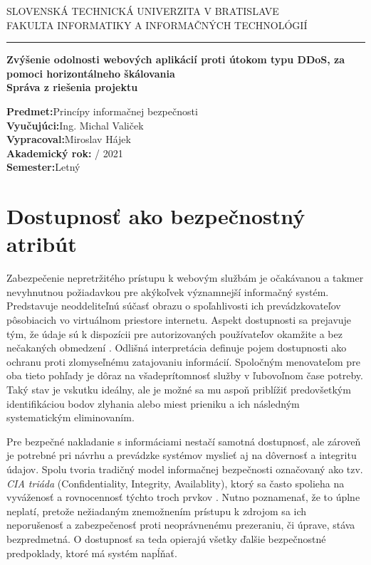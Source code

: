\documentclass[12pt, a4paper]{article}
\begin{document}
\begin{titlepage}
    \hspace{0pt}
    \centering
    \large SLOVENSKÁ TECHNICKÁ UNIVERZITA V BRATISLAVE \\
    \large FAKULTA INFORMATIKY A INFORMAČNÝCH TECHNOLÓGIÍ
    \noindent\rule{\textwidth}{1pt}
    \vfill
    \Large \textbf{Zvýšenie odolnosti webových aplikácií proti útokom typu DDoS, za pomoci horizontálneho  škálovania}\\
    \vspace{1cm}
    \large \textbf{Správa z riešenia projektu}
    \vfill
    \normalsize
    \begin{flushleft}
    \textbf{Predmet:}\quad Princípy informačnej bezpečnosti \\
    \textbf{Vyučujúci:}\quad Ing. Michal Valiček \\
    \textbf{Vypracoval:}\quad Miroslav Hájek \\
	\textbf{Akademický rok:} / 2021 \\
	\textbf{Semester:}\quad Letný
	\end{flushleft}
\end{titlepage}


\tableofcontents
\newpage
{}
\setcounter{page}{1}

\section{Dostupnosť ako bezpečnostný atribút}
Zabezpečenie nepretržitého prístupu k webovým službám je očakávanou a takmer nevyhnutnou požiadavkou pre 
akýkoľvek významnejší informačný systém. Predstavuje neoddeliteľnú súčasť obrazu o spoľahlivosti 
ich prevádzkovateľov pôsobiacich vo virtuálnom priestore internetu. Aspekt dostupnosti sa prejavuje tým,
že údaje sú k dispozícii pre autorizovaných používateľov okamžite a bez nečakaných obmedzení   
 \cite{availability}. Odlišná interpretácia definuje pojem dostupnosti ako ochranu proti zlomyseľnému 
zatajovaniu informácií. Spoločným menovateľom pre oba tieto pohľady je dôraz na všadeprítomnosť služby v 
ľubovoľnom čase potreby. Taký stav je vskutku ideálny, ale je možné sa mu aspoň priblížiť predovšetkým 
identifikáciou bodov zlyhania alebo miest prieniku a ich následným systematickým eliminovaním.

Pre bezpečné nakladanie s informáciami nestačí samotná dostupnosť, ale zároveň je potrebné pri návrhu a 
prevádzke systémov myslieť aj na dôvernosť a integritu údajov. Spolu tvoria tradičný model informačnej 
bezpečnosti označovaný ako tzv. \emph{CIA triáda} (Confidentiality, Integrity, Availablity), ktorý sa často 
spolieha na vyváženosť a rovnocennosť týchto troch prvkov \cite{availability}. Nutno poznamenať, 
že to úplne neplatí, pretože nežiadaným znemožnením prístupu k zdrojom sa ich neporušenosť a zabezpečenosť 
proti neoprávnenému prezeraniu, či úprave, stáva bezpredmetná. O dostupnosť sa teda opierajú všetky ďalšie
bezpečnostné predpoklady, ktoré má systém napĺňať.
\end{document}
